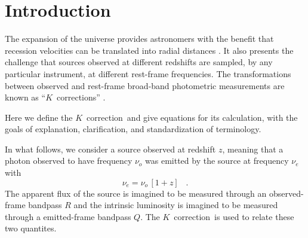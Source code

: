 \documentclass[preprint]{aastex}
\newcommand{\kcorrection}{$K$~correction}
\newcommand{\kcorrections}{{\kcorrection}s}
\newcommand{\nuobs}{\nu_o}
\newcommand{\nuemit}{\nu_e}
\begin{document}
\title{\scalebox{1.5}{The \kcorrection}}
\author{
  David W. Hogg,
  Michael Blanton,
  Daniel J. Eisenstein,
  and Ivan K. Baldry\\
  \textsl{fifth draft---2002 August 15}
}

\begin{abstract}
The \kcorrection\ is used to relate the emitted- or rest-frame
absolute magnitude of a source in one broad photometric bandpass to
the observed-frame apparent magnitude of the same source in another
broad bandpass.  This short paper provides definitions, equations and
pedagogical discussion related to the \kcorrection.
\end{abstract}

\section{Introduction}

The expansion of the universe provides astronomers with the benefit
that recession velocities can be translated into radial distances
\citep[eg,][and references therein]{hogg99cosm}.  It also presents the
challenge that sources observed at different redshifts are sampled, by
any particular instrument, at different rest-frame frequencies.  The
transformations between observed and rest-frame broad-band photometric
measurements are known as ``\kcorrections'' \citep*{humason56a,
oke68a}.

Here we define the \kcorrection\ and give equations for its
calculation, with the goals of explanation, clarification, and
standardization of terminology.

In what follows, we consider a source observed at redshift $z$,
meaning that a photon observed to have frequency $\nuobs$ was emitted
by the source at frequency $\nuemit$ with
\begin{equation}
\nuemit = \nuobs\,[1+z] \;\;\;.
\end{equation}
The apparent flux of the source is imagined to be measured through an
observed-frame bandpass $R$ and the intrinsic luminosity is imagined
to be measured through a emitted-frame bandpass $Q$.  The
\kcorrection\ is used to relate these two quantites.
\end{document}
